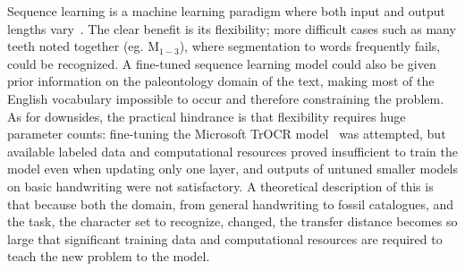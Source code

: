 \documentclass[english,twoside,openright]{UH_DS_MSc}
\begin{document}
Sequence learning is a machine learning paradigm where both input and output lengths vary~\cite{sutskever2014sequence}.
The clear benefit is its flexibility; more difficult cases such as many teeth noted together (eg. $\text{M}_{1-3}$),
where segmentation to words frequently fails, could be recognized. A fine-tuned sequence learning 
model could also be given prior information on the paleontology domain of the text, making
most of the English vocabulary impossible to occur and therefore constraining the problem. As for downsides, the practical hindrance is 
that flexibility requires huge parameter counts: fine-tuning the 
Microsoft TrOCR model~\cite{li2021trocr} was attempted, but available labeled data and computational 
resources proved insufficient to train the model even when updating only one layer,
and outputs of untuned smaller models on basic handwriting were not satisfactory.
A theoretical description of this is that because both the domain, from general handwriting to fossil catalogues, 
and the task, the character set to recognize, changed, the transfer distance becomes so large 
that significant training data and computational resources are required to teach the new problem to the model.


\end{document}
